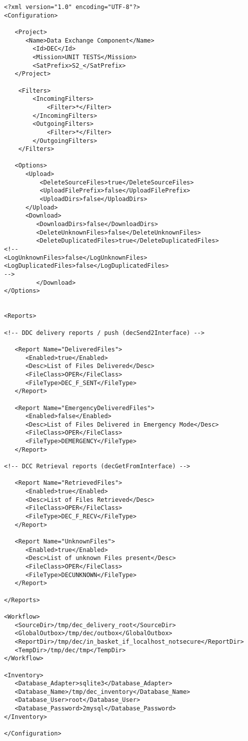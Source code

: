 \documentclass[dec_sum_main.tex]{subfiles}
\begin{document}
\begin{verbatim}
<?xml version="1.0" encoding="UTF-8"?>
<Configuration>

   <Project>
      <Name>Data Exchange Component</Name>
        <Id>DEC</Id>
        <Mission>UNIT TESTS</Mission>
        <SatPrefix>S2_</SatPrefix>
   </Project>

	<Filters>
		<IncomingFilters>
			<Filter>*</Filter>
		</IncomingFilters>
		<OutgoingFilters>
			<Filter>*</Filter>
		</OutgoingFilters>
	</Filters>

   <Options>
      <Upload>
          <DeleteSourceFiles>true</DeleteSourceFiles>
          <UploadFilePrefix>false</UploadFilePrefix>
          <UploadDirs>false</UploadDirs>
      </Upload>
      <Download>
         <DownloadDirs>false</DownloadDirs>
         <DeleteUnknownFiles>false</DeleteUnknownFiles>
         <DeleteDuplicatedFiles>true</DeleteDuplicatedFiles>
<!--
<LogUnknownFiles>false</LogUnknownFiles>
<LogDuplicatedFiles>false</LogDuplicatedFiles>     
-->    
         </Download>
</Options>


<Reports>

<!-- DDC delivery reports / push (decSend2Interface) -->      

   <Report Name="DeliveredFiles">
      <Enabled>true</Enabled>
      <Desc>List of Files Delivered</Desc>
      <FileClass>OPER</FileClass>
      <FileType>DEC_F_SENT</FileType>
   </Report>

   <Report Name="EmergencyDeliveredFiles">
      <Enabled>false</Enabled>
      <Desc>List of Files Delivered in Emergency Mode</Desc>
      <FileClass>OPER</FileClass>
      <FileType>DEMERGENCY</FileType>
   </Report>

<!-- DCC Retrieval reports (decGetFromInterface) -->

   <Report Name="RetrievedFiles">
      <Enabled>true</Enabled>
      <Desc>List of Files Retrieved</Desc>
      <FileClass>OPER</FileClass>
      <FileType>DEC_F_RECV</FileType>
   </Report>

   <Report Name="UnknownFiles">
      <Enabled>true</Enabled>
      <Desc>List of unknown Files present</Desc>
      <FileClass>OPER</FileClass>
      <FileType>DECUNKNOWN</FileType>
   </Report>

</Reports>

<Workflow>
   <SourceDir>/tmp/dec_delivery_root</SourceDir>
   <GlobalOutbox>/tmp/dec/outbox</GlobalOutbox>
   <ReportDir>/tmp/dec/in_basket_if_localhost_notsecure</ReportDir>
   <TempDir>/tmp/dec/tmp</TempDir>
</Workflow>

<Inventory>
   <Database_Adapter>sqlite3</Database_Adapter>
   <Database_Name>/tmp/dec_inventory</Database_Name>
   <Database_User>root</Database_User>
   <Database_Password>2mysql</Database_Password>
</Inventory>

</Configuration>


\end{verbatim}
\end{document}
